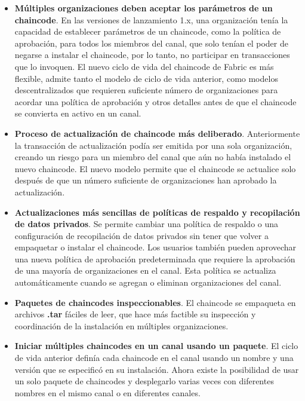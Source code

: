 {\begin{itemize}
\item {\bf M\'ultiples organizaciones deben aceptar los par\'ametros de un chaincode}. En las versiones de lanzamiento 1.x, una organizaci\'on ten\'ia la capacidad de establecer par\'ametros de un chaincode, como la pol\'itica de aprobaci\'on, para todos los miembros del canal, que solo ten\'ian el poder de negarse a instalar el chaincode, por lo tanto, no participar en transacciones que lo invoquen. El nuevo ciclo de vida del chaincode de Fabric es m\'as flexible, admite tanto el modelo de ciclo de vida anterior, como modelos descentralizados que requieren suficiente n\'umero de organizaciones para acordar una pol\'itica de aprobaci\'on y otros detalles antes de que el chaincode se convierta en activo en un canal.

\item {\bf Proceso de actualizaci\'on de chaincode m\'as deliberado}. Anteriormente la transacci\'on de actualizaci\'on pod\'ia ser emitida por una sola organizaci\'on, creando un riesgo para un miembro del canal que a\'un no hab\'ia instalado el nuevo chaincode. El nuevo modelo permite que el chaincode se actualice solo despu\'es de que un n\'umero suficiente de organizaciones han aprobado la actualizaci\'on.

\item {\bf Actualizaciones m\'as sencillas de pol\'iticas de respaldo y recopilaci\'on de datos privados}. Se permite cambiar una pol\'itica de respaldo o una configuraci\'on de recopilaci\'on de datos privados sin tener que volver a empaquetar o instalar el chaincode. Los usuarios tambi\'en pueden aprovechar una nueva pol\'itica de aprobaci\'on predeterminada que requiere la aprobaci\'on de una mayor\'ia de organizaciones en el canal. Esta pol\'itica se actualiza autom\'aticamente cuando se agregan o eliminan organizaciones del canal.

\item {\bf Paquetes de chaincodes inspeccionables}. El chaincode se empaqueta en archivos {\bf .tar} f\'aciles de leer, que hace m\'as factible su inspecci\'on  y coordinaci\'on de la instalaci\'on en m\'ultiples organizaciones.

\item {\bf Iniciar m\'ultiples chaincodes en un canal usando un paquete}. El ciclo de vida anterior defin\'ia cada chaincode en el canal usando un nombre y una versi\'on que se especific\'o en su instalaci\'on. Ahora existe la posibilidad de usar un solo paquete de chaincodes y desplegarlo varias veces con diferentes nombres en el mismo canal o en diferentes canales.
\end{itemize}

}
